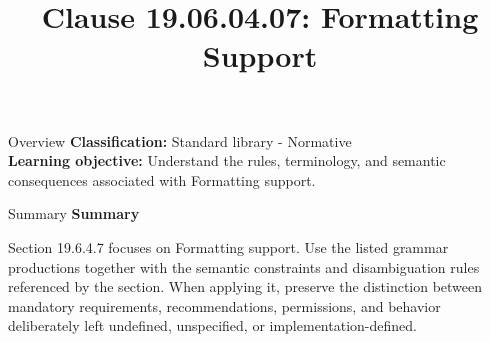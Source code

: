 \documentclass[10pt,letterpaper]{article}
\title{Clause 19.06.04.07: Formatting Support}
\author{}
\date{}
\begin{document}
\maketitle
\begin{CornellOverviewBox}{Overview}
\textbf{Classification:} Standard library - Normative\\[2pt]
\textbf{Learning objective:} Understand the rules, terminology, and semantic consequences associated with Formatting support.
\end{CornellOverviewBox}\begin{CornellSummaryBox}{Summary}
{\sffamily\bfseries\color{Accent} Summary}\par\vspace{3pt}Section 19.6.4.7 focuses on Formatting support. Use the listed grammar productions together with the semantic constraints and disambiguation rules referenced by the section. When applying it, preserve the distinction between mandatory requirements, recommendations, permissions, and behavior deliberately left undefined, unspecified, or implementation-defined.
\end{CornellSummaryBox}
\end{document}
